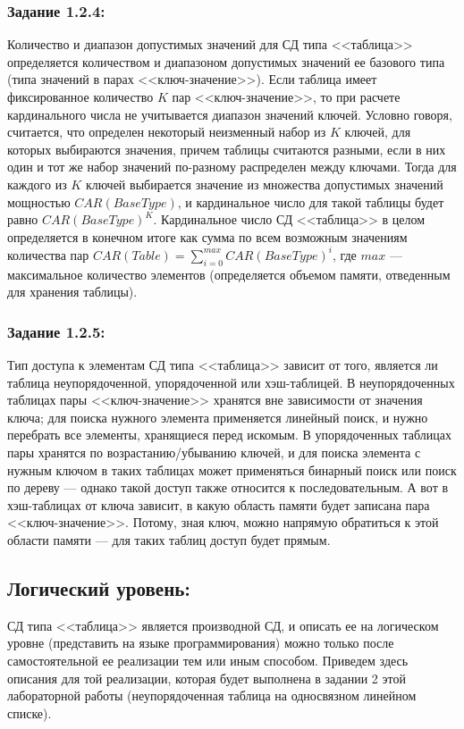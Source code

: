 \documentclass[12pt]{article}
\begin{document}
{	\subsubsection{Задание 1.2.4:}
	\label{task_1_2_4}
	
	Количество и диапазон допустимых значений для СД типа <<таблица>> определяется количеством и диапазоном допустимых значений ее базового типа (типа значений в парах <<ключ-значение>>). Если таблица имеет фиксированное количество $K$ пар <<ключ-значение>>, то при расчете кардинального числа не учитывается диапазон значений ключей. Условно говоря, считается, что определен некоторый неизменный набор из $K$ ключей, для которых выбираются значения, причем таблицы считаются разными, если в них один и тот же набор значений по-разному распределен между ключами. Тогда для каждого из $K$ ключей выбирается значение из множества допустимых значений мощностью $CAR(BaseType)$, и кардинальное число для такой таблицы будет равно $CAR(BaseType)^K$. Кардинальное число СД <<таблица>> в целом определяется в конечном итоге как сумма по всем возможным значениям количества пар $CAR(Table) = \sum_{i = 0}^{max}{CAR(BaseType)^i}$, где $max$ --- максимальное количество элементов (определяется объемом памяти, отведенным для хранения таблицы). 
		
	\subsubsection{Задание 1.2.5:}
	\label{task_1_2_5}
	Тип доступа к элементам СД типа <<таблица>> зависит от того, является ли таблица неупорядоченной, упорядоченной или хэш-таблицей. В неупорядоченных таблицах пары <<ключ-значение>> хранятся вне зависимости от значения ключа; для поиска нужного элемента применяется линейный поиск, и нужно перебрать все элементы, хранящиеся перед искомым. В упорядоченных таблицах пары хранятся по возрастанию/убыванию ключей, и для поиска элемента с нужным ключом в таких таблицах может применяться бинарный поиск или поиск по дереву --- однако такой доступ также относится к последовательным. А вот в хэш-таблицах от ключа зависит, в какую область памяти будет записана пара <<ключ-значение>>. Потому, зная ключ, можно напрямую обратиться к этой области памяти --- для таких таблиц доступ будет прямым.
	
	\subsection{Логический уровень:}
	\label{task_1_3}
	СД типа <<таблица>> является производной СД, и описать ее на логическом уровне (представить на языке программирования) можно только после  самостоятельной ее реализации тем или иным способом. Приведем здесь описания для той реализации, которая будет выполнена в задании 2 этой лабораторной работы (неупорядоченная таблица на односвязном линейном списке).
	
}
\end{document}
